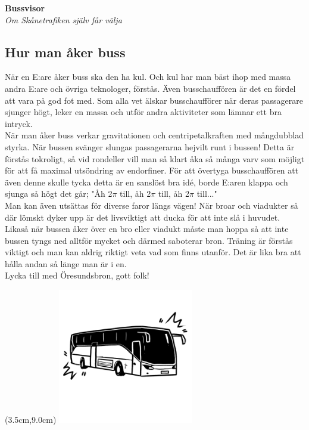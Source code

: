\begin{center}
    \vspace*{1.5cm}
    {\fontsize{20}{20}\textbf{Bussvisor}}\\
    \vspace{0.7cm}
    {\fontsize{12}{12}\textit{Om Skånetrafiken själv får välja}}
\end{center}
\noBackground

\newpage
\resetBackground


\subsection*{Hur man åker buss}
När en E:are åker buss ska den ha kul. Och kul har man bäst ihop med 
massa andra E:are och övriga teknologer, förstås. Även busschauffören 
är det en fördel att vara på god fot med. Som alla vet älskar busschaufförer 
när deras passagerare sjunger högt, leker en massa och utför andra aktiviteter 
som lämnar ett bra intryck.
\\

När man åker buss verkar gravitationen och centripetalkraften med 
mångdubblad styrka. När bussen svänger slungas passagerarna hejvilt 
runt i bussen! Detta är förstås tokroligt, så vid rondeller vill man 
så klart åka så många varv som möjligt för att få maximal utsöndring 
av endorfiner. För att övertyga busschauffören att även denne skulle 
tycka detta är en sanslöst bra idé, borde E:aren klappa och sjunga så 
högt det går; "Åh 2$\pi$ till, åh 2$\pi$ till, åh 2$\pi$ till..."
\\

Man kan även utsättas för diverse faror längs vägen! När broar 
och viadukter så där lömskt dyker upp är det livsviktigt att ducka 
för att inte slå i huvudet. Likaså när bussen åker över en bro eller 
viadukt måste man hoppa så att inte bussen tyngs ned alltför mycket 
och därmed saboterar bron. Träning är förstås viktigt och man kan 
aldrig riktigt veta vad som finns utanför. Det är lika bra att hålla 
andan så länge man är i en.
\\

Lycka till med Öresundsbron, gott folk!

\newpage
\noBackground
\begin{textblock*}{3cm}(3.5cm,9.0cm) %
    \includegraphics[width=5.9cm]{./bilder/ruths-bilder/buss.png}
\end{textblock*}


